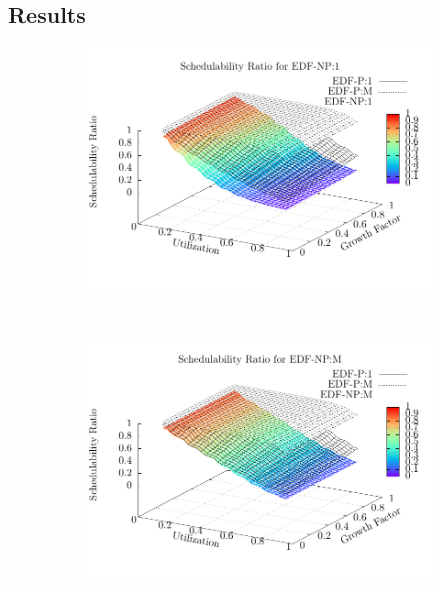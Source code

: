 \subsection{Results}

\begin{figure}
  \begin{subfigure}[t]{\linewidth}
    \includegraphics[width=\linewidth]{plot/avg-alg-sched/avg-ratio-NP-1.pdf}
  \end{subfigure}\\
  \begin{subfigure}[t]{\linewidth}
    \includegraphics[width=\linewidth]{plot/avg-alg-sched/avg-ratio-NP-m}
  \end{subfigure}\\
  \begin{subfigure}[t]{\linewidth}

\end{subfigure}
\end{figure}
